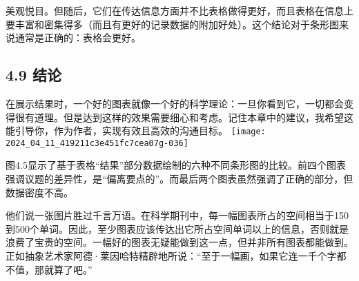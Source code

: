 美观悦目。但随后，它们在传达信息方面并不比表格做得更好，而且表格在信息上要丰富和密集得多（而且有更好的记录数据的附加好处）。这个结论对于条形图来说通常是正确的：表格会更好。

\subsection*{4.9 结论}
在展示结果时，一个好的图表就像一个好的科学理论：一旦你看到它，一切都会变得很有道理。但是达到这样的效果需要细心和考虑。记住本章中的建议，我希望这能引导你，作为作者，实现有效且高效的沟通目标。
\texttt{[image: 2024\_04\_11\_419211c3e451fc7cea07g-036]}

图4.5显示了基于表格“结果”部分数据绘制的六种不同条形图的比较。前四个图表强调议题的差异性，是“偏离要点的”。而最后两个图表虽然强调了正确的部分，但数据密度不高。

他们说一张图片胜过千言万语。在科学期刊中，每一幅图表所占的空间相当于150到500个单词。因此，至少图表应该传达出它所占空间单词以上的信息，否则就是浪费了宝贵的空间。一幅好的图表无疑能做到这一点，但并非所有图表都能做到。正如抽象艺术家阿德·莱因哈特精辟地所说：“至于一幅画，如果它连一千个字都不值，那就算了吧。”

